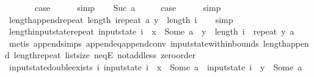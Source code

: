 \begin{isabellebody}
\ {}\isanewline
\ \ \isamarkupfalse%
\ \isamarkupfalse%
\ {\isacharquery}case\isanewline
\ \ \ \ \isamarkupfalse%
\ simp\isanewline
{}\isamarkupfalse%
\isanewline
\ \ \isamarkupfalse%
\ {\isacharparenleft}Suc\ a{\isacharparenright}\isanewline
\ \ \isamarkupfalse%
\ \isamarkupfalse%
\ {\isacharquery}case\isanewline
\ \ \ \ \isamarkupfalse%
\ simp\isanewline
{}\isamarkupfalse%
%
\endisatagproof
{\isafoldproof}%
%
\isadelimproof
\isanewline
%
\endisadelimproof
\isanewline
{}\isamarkupfalse%
\ length{\isacharunderscore}append{\isacharunderscore}repeat{\isacharcolon}\ {\isachardoublequoteopen}length\ {\isacharparenleft}i{\isacharat}{\isacharparenleft}repeat\ a\ y{\isacharparenright}{\isacharparenright}\ {\isasymge}\ length\ i{\isachardoublequoteclose}\isanewline
%
\isadelimproof
\ \ %
\endisadelimproof
%
\isatagproof
{}\isamarkupfalse%
\ simp%
\endisatagproof
{\isafoldproof}%
%
\isadelimproof
\isanewline
%
\endisadelimproof
\isanewline
{}\isamarkupfalse%
\ length{\isacharunderscore}input{}state{\isacharunderscore}repeat{\isacharcolon}\ {\isachardoublequoteopen}input{}state\ i\ {\isachardollar}\ x\ {\isacharequal}\ Some\ a\ {\isasymLongrightarrow}\ y\ {\isacharless}\ length\ {\isacharparenleft}i\ {\isacharat}\ repeat\ y\ a{\isacharparenright}{\isachardoublequoteclose}\isanewline
%
\isadelimproof
\ \ %
\endisadelimproof
%
\isatagproof
{}\isamarkupfalse%
\ {\isacharparenleft}metis\ append{\isachardot}simps{\isacharparenleft}{}{\isacharparenright}\ append{\isacharunderscore}eq{\isacharunderscore}append{\isacharunderscore}conv\ input{}state{\isacharunderscore}within{\isacharunderscore}bounds\ length{\isacharunderscore}append\ length{\isacharunderscore}repeat\ list{\isachardot}size{\isacharparenleft}{}{\isacharparenright}\ neqE\ not{\isacharunderscore}add{\isacharunderscore}less{}\ zero{\isacharunderscore}order{\isacharparenleft}{}{\isacharparenright}{\isacharparenright}%
\endisatagproof
{\isafoldproof}%
%
\isadelimproof
\isanewline
%
\endisadelimproof
\isanewline
{}\isamarkupfalse%
\ input{}state{\isacharunderscore}double{\isacharunderscore}exists{\isacharcolon}\ {\isachardoublequoteopen}{\isasymexists}i{\isachardot}\ input{}state\ i\ {\isachardollar}\ x\ {\isacharequal}\ Some\ a\ {\isasymand}\ input{}state\ i\ {\isachardollar}\ y\ {\isacharequal}\ Some\ a{\isachardoublequoteclose}\isanewline

\end{isabellebody}
